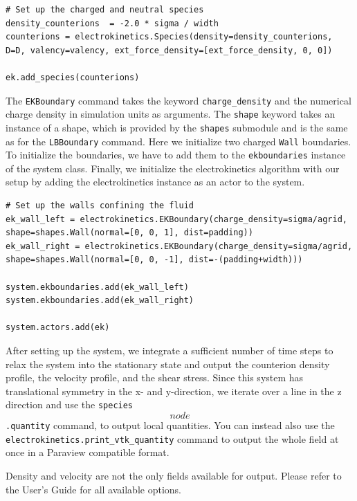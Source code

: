 \begin{lstlisting}[firstnumber=45]
# Set up the charged and neutral species
density_counterions  = -2.0 * sigma / width
counterions = electrokinetics.Species(density=density_counterions, D=D, valency=valency, ext_force_density=[ext_force_density, 0, 0])

ek.add_species(counterions)
\end{lstlisting}

The \texttt{EKBoundary} command takes the keyword \texttt{charge\_density} and the numerical charge density in simulation units as arguments. The \texttt{shape} keyword takes an instance of a shape, which is provided by the \texttt{shapes} submodule and is the same as for the \texttt{LBBoundary} command. Here we initialize two charged \texttt{Wall} boundaries. To initialize the boundaries, we have to add them to the \texttt{ekboundaries} instance of the system class. Finally, we initialize the electrokinetics algorithm with our setup by adding the electrokinetics instance as an actor to the system.

\begin{lstlisting}[firstnumber=53]
# Set up the walls confining the fluid
ek_wall_left = electrokinetics.EKBoundary(charge_density=sigma/agrid, shape=shapes.Wall(normal=[0, 0, 1], dist=padding)) 
ek_wall_right = electrokinetics.EKBoundary(charge_density=sigma/agrid, shape=shapes.Wall(normal=[0, 0, -1], dist=-(padding+width)))

system.ekboundaries.add(ek_wall_left)
system.ekboundaries.add(ek_wall_right)

system.actors.add(ek)
\end{lstlisting}

After setting up the system, we integrate a sufficient number of time steps to relax the system into the stationary state and output the counterion density profile, the velocity profile, and the shear stress. Since this system has translational symmetry in the x- and y-direction, we iterate over a line in the z direction and use the \texttt{species\[node\].quantity} command, to output local quantities. You can instead also use the \texttt{electrokinetics.print\_vtk\_quantity} command to output the whole field at once in a Paraview compatible format.

Density and velocity are not the only fields available for output. Please refer to the User's Guide for all available options.

